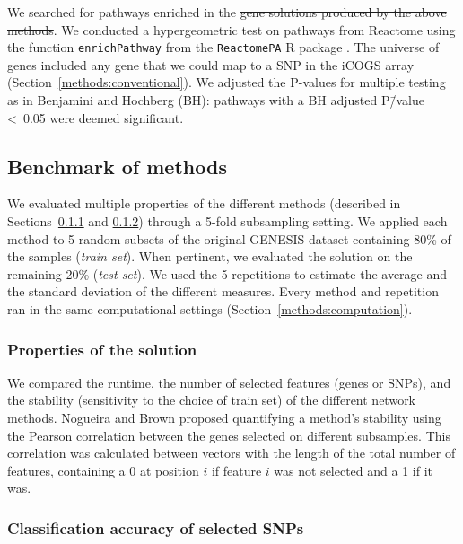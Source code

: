 \documentclass[10pt,letterpaper]{article}
\providecommand{\DIFaddtex}[1]{{\protect\color{blue}\uwave{#1}}} %
\providecommand{\DIFdeltex}[1]{{\protect\color{red}\sout{#1}}}                      %
\providecommand{\DIFaddbegin}{} %
\providecommand{\DIFaddend}{} %
\providecommand{\DIFdelbegin}{} %
\providecommand{\DIFdelend}{} %
\providecommand{\DIFadd}[1]{\texorpdfstring{\DIFaddtex{#1}}{#1}} %
\providecommand{\DIFdel}[1]{\texorpdfstring{\DIFdeltex{#1}}{}} %
\newcommand{\DIFscaledelfig}{0.5}
\newlength{\DIFdelgraphicswidth} %
\newlength{\DIFdelgraphicsheight} %
\newcommand{\DIFaddincludegraphics}[2][]{{\color{blue}\fbox{\DIFOincludegraphics[#1]{#2}}}} %
\newcommand{\DIFdelincludegraphics}[2][]{%
\sbox{\DIFdelgraphicsbox}{\DIFOincludegraphics[#1]{#2}}%
\settoboxwidth{\DIFdelgraphicswidth}{\DIFdelgraphicsbox} %
\settoboxtotalheight{\DIFdelgraphicsheight}{\DIFdelgraphicsbox} %
\scalebox{\DIFscaledelfig}{%
\parbox[b]{\DIFdelgraphicswidth}{\usebox{\DIFdelgraphicsbox}\\[-\baselineskip] \rule{\DIFdelgraphicswidth}{0em}}\llap{\resizebox{\DIFdelgraphicswidth}{\DIFdelgraphicsheight}{%
\setlength{\unitlength}{\DIFdelgraphicswidth}%
\begin{picture}(1,1)%
\thicklines\linethickness{2pt} %
{\color[rgb]{1,0,0}\put(0,0){\framebox(1,1){}}}%
{\color[rgb]{1,0,0}\put(0,0){\line( 1,1){1}}}%
{\color[rgb]{1,0,0}\put(0,1){\line(1,-1){1}}}%
\end{picture}%
}\hspace*{3pt}}} %
} %
\DeclareRobustCommand{\DIFaddbegin}{\DIFOaddbegin \let\includegraphics\DIFaddincludegraphics} %
\DeclareRobustCommand{\DIFaddend}{\DIFOaddend \let\includegraphics\DIFOincludegraphics} %
\DeclareRobustCommand{\DIFdelbegin}{\DIFOdelbegin \let\includegraphics\DIFdelincludegraphics} %
\DeclareRobustCommand{\DIFdelend}{\DIFOaddend \let\includegraphics\DIFOincludegraphics} %
\begin{document}
We searched for pathways enriched in the \DIFdelbegin \DIFdel{gene solutions produced by the above methods}\DIFdelend \DIFaddbegin \DIFadd{solution of each network method}\DIFaddend . We conducted a hypergeometric test on pathways from Reactome \cite{Jassal2019} using the function \texttt{enrichPathway} from the \texttt{ReactomePA} R package \cite{Yu2016}. The universe of genes included any gene that we could map to a SNP in the iCOGS array (Section~\ref{methods:conventional}). We adjusted the P-values for multiple testing as in Benjamini and Hochberg \cite{Benjamini1995} (BH): pathways with a BH adjusted P\=/value \textless~0.05 were deemed significant.

\subsection{Benchmark of methods}
\label{methods:benchmark}

We evaluated multiple properties of the different methods (described in Sections~\ref{methods:algorithm_comparison} and \ref{methods:classifier}) through a 5-fold subsampling setting. We applied each method to 5 random subsets of the original GENESIS dataset containing 80\% of the samples (\emph{train set}). When pertinent, we evaluated the solution on the remaining 20\% (\emph{test set}). We used the 5 repetitions to estimate the average and the standard deviation of the different measures. Every method and repetition ran in the same computational settings (Section~\ref{methods:computation}).

\subsubsection{Properties of the solution}
\label{methods:algorithm_comparison}

We compared the runtime, the number of selected features (genes or SNPs), and the stability (sensitivity to the choice of train set) of the different network methods. Nogueira and Brown \cite{nogueira_measuring_2016} proposed quantifying a method's stability using the Pearson correlation between the genes selected on different subsamples. This correlation was calculated between vectors with the length of the total number of features, containing a 0 at position $i$ if feature $i$ was not selected and a 1 if it was.

\subsubsection{Classification accuracy of selected SNPs}
\label{methods:classifier}
\end{document}
